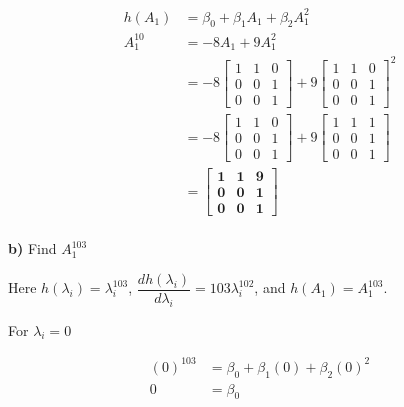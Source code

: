 \begin{align}
  h(A_1)   &= \beta_0 + \beta_1 A_1 + \beta_2 A_1^2 \nonumber \\
  A_1^{10} &= -8 A_1 + 9 A_1^2 \nonumber \\
           &= -8 \begin{bmatrix} 
                  1 & 1 & 0 \\ 
                  0 & 0 & 1 \\
                  0 & 0 & 1
                \end{bmatrix} \nonumber
              + 9 \begin{bmatrix} 
                  1 & 1 & 0 \\ 
                  0 & 0 & 1 \\
                  0 & 0 & 1
                \end{bmatrix}^2 \nonumber \\
           &= -8 \begin{bmatrix} 
                  1 & 1 & 0 \\ 
                  0 & 0 & 1 \\
                  0 & 0 & 1
                \end{bmatrix} \nonumber
              + 9 \begin{bmatrix} 
                  1 & 1 & 1 \\ 
                  0 & 0 & 1 \\
                  0 & 0 & 1
                \end{bmatrix} \nonumber \\
           &= \mathbf{
           \begin{bmatrix} 
              1 & 1 & 9 \\ 
              0 & 0 & 1 \\
              0 & 0 & 1
           \end{bmatrix}
           } \nonumber \\
\end{align}

\noindent \textbf{b)} Find $A_1^{103}$

Here $h(\lambda_i) = \lambda_i^{103}$, 
$\dfrac{d h(\lambda_i)}{d \lambda_i} = 103 \lambda_i^{102}$, and 
$h(A_1) = A_1^{103}$.

For $\lambda_i = 0$

\begin{align}
  (0)^{103} &= \beta_0 + \beta_1 (0) + \beta_2 (0)^2 \nonumber \\
         0  &= \beta_0 
\end{align}

